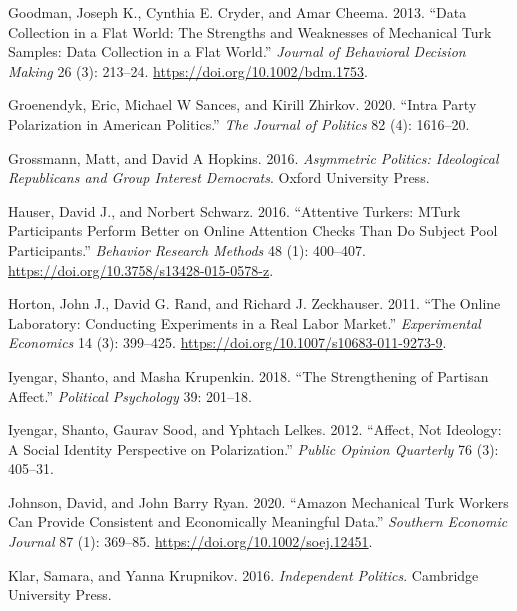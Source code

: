 \documentclass[
]{article}
\newlength{\cslhangindent}
\newenvironment{CSLReferences}[2] %
 {%
  \setlength{\parindent}{0pt}
  \ifodd #1 \everypar{\setlength{\hangindent}{\cslhangindent}}\ignorespaces\fi
  \ifnum #2 > 0
  \setlength{\parskip}{#2\baselineskip}
  \fi
 }%
 {}
\begin{document}
\begin{CSLReferences}{1}{0}
\leavevmode{}%
Goodman, Joseph K., Cynthia E. Cryder, and Amar Cheema. 2013. {``Data {Collection} in a {Flat World}: {The Strengths} and {Weaknesses} of {Mechanical Turk Samples}: {Data Collection} in a {Flat World}.''} \emph{Journal of Behavioral Decision Making} 26 (3): 213--24. \url{https://doi.org/10.1002/bdm.1753}.

\leavevmode{}%
Groenendyk, Eric, Michael W Sances, and Kirill Zhirkov. 2020. {``Intra Party Polarization in American Politics.''} \emph{The Journal of Politics} 82 (4): 1616--20.

\leavevmode{}%
Grossmann, Matt, and David A Hopkins. 2016. \emph{Asymmetric Politics: Ideological Republicans and Group Interest Democrats}. {Oxford University Press}.

\leavevmode{}%
Hauser, David J., and Norbert Schwarz. 2016. {``Attentive {Turkers}: {MTurk} Participants Perform Better on Online Attention Checks Than Do Subject Pool Participants.''} \emph{Behavior Research Methods} 48 (1): 400--407. \url{https://doi.org/10.3758/s13428-015-0578-z}.

\leavevmode{}%
Horton, John J., David G. Rand, and Richard J. Zeckhauser. 2011. {``The Online Laboratory: Conducting Experiments in a Real Labor Market.''} \emph{Experimental Economics} 14 (3): 399--425. \url{https://doi.org/10.1007/s10683-011-9273-9}.

\leavevmode{}%
Iyengar, Shanto, and Masha Krupenkin. 2018. {``The Strengthening of Partisan Affect.''} \emph{Political Psychology} 39: 201--18.

\leavevmode{}%
Iyengar, Shanto, Gaurav Sood, and Yphtach Lelkes. 2012. {``Affect, Not Ideology: A Social Identity Perspective on Polarization.''} \emph{Public Opinion Quarterly} 76 (3): 405--31.

\leavevmode{}%
Johnson, David, and John Barry Ryan. 2020. {``Amazon {Mechanical Turk} Workers Can Provide Consistent and Economically Meaningful Data.''} \emph{Southern Economic Journal} 87 (1): 369--85. \url{https://doi.org/10.1002/soej.12451}.

\leavevmode{}%
Klar, Samara, and Yanna Krupnikov. 2016. \emph{Independent Politics}. {Cambridge University Press}.


\end{CSLReferences}
\end{document}
